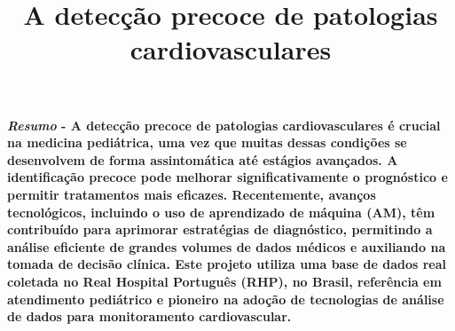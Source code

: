 \documentclass[10pt, conference, compsocconf]{IEEEtran}
\begin{document}
%
\title{A detecção precoce de patologias cardiovasculares}



\author{
}


% 








\maketitle

\textbf{\textit{Resumo} - A detecção precoce de patologias cardiovasculares é crucial na medicina pediátrica, uma vez que muitas dessas condições se desenvolvem de forma assintomática 
até estágios avançados. A identificação precoce pode melhorar significativamente o prognóstico e permitir tratamentos mais eficazes. Recentemente, avanços tecnológicos, incluindo o uso de 
aprendizado de máquina (AM), têm contribuído para aprimorar estratégias de diagnóstico, permitindo a análise eficiente de grandes volumes de dados médicos e auxiliando na tomada de 
decisão clínica. Este projeto utiliza uma base de dados real coletada no Real Hospital Português (RHP), no Brasil, referência em atendimento pediátrico e pioneiro na adoção de tecnologias 
de análise de dados para monitoramento cardiovascular.}
\end{document}
